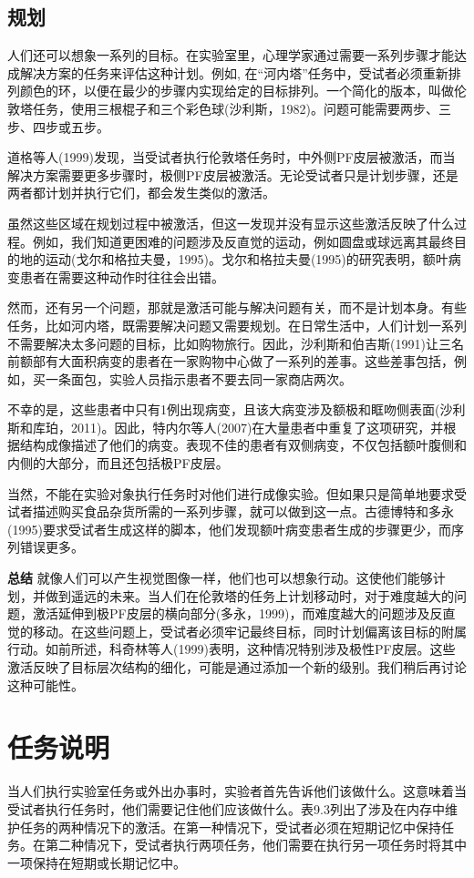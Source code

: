 \subsection{规划}
人们还可以想象一系列的目标。在实验室里，心理学家通过需要一系列步骤才能达成解决方案的任务来评估这种计划。例如, 在“河内塔”任务中，受试者必须重新排列颜色的环，以便在最少的步骤内实现给定的目标排列。一个简化的版本，叫做伦敦塔任务，使用三根棍子和三个彩色球(沙利斯，1982)。问题可能需要两步、三步、四步或五步。
\par
道格等人(1999)发现，当受试者执行伦敦塔任务时，中外侧PF皮层被激活，而当解决方案需要更多步骤时，极侧PF皮层被激活。无论受试者只是计划步骤，还是两者都计划并执行它们，都会发生类似的激活。
\par
虽然这些区域在规划过程中被激活，但这一发现并没有显示这些激活反映了什么过程。例如，我们知道更困难的问题涉及反直觉的运动，例如圆盘或球远离其最终目的地的运动(戈尔和格拉夫曼，1995)。戈尔和格拉夫曼(1995)的研究表明，额叶病变患者在需要这种动作时往往会出错。
\par
然而，还有另一个问题，那就是激活可能与解决问题有关，而不是计划本身。有些任务，比如河内塔，既需要解决问题又需要规划。在日常生活中，人们计划一系列不需要解决太多问题的目标，比如购物旅行。因此，沙利斯和伯吉斯(1991)让三名前额部有大面积病变的患者在一家购物中心做了一系列的差事。这些差事包括，例如，买一条面包，实验人员指示患者不要去同一家商店两次。
\par
不幸的是，这些患者中只有1例出现病变，且该大病变涉及额极和眶吻侧表面(沙利斯和库珀，2011)。因此，特内尔等人(2007)在大量患者中重复了这项研究，并根据结构成像描述了他们的病变。表现不佳的患者有双侧病变，不仅包括额叶腹侧和内侧的大部分，而且还包括极PF皮层。
\par
当然，不能在实验对象执行任务时对他们进行成像实验。但如果只是简单地要求受试者描述购买食品杂货所需的一系列步骤，就可以做到这一点。古德博特和多永(1995)要求受试者生成这样的脚本，他们发现额叶病变患者生成的步骤更少，而序列错误更多。
\par
\textbf{总结}
就像人们可以产生视觉图像一样，他们也可以想象行动。这使他们能够计划，并做到遥远的未来。当人们在伦敦塔的任务上计划移动时，对于难度越大的问题，激活延伸到极PF皮层的横向部分(多永，1999)，而难度越大的问题涉及反直觉的移动。在这些问题上，受试者必须牢记最终目标，同时计划偏离该目标的附属行动。如前所述，科奇林等人(1999)表明，这种情况特别涉及极性PF皮层。这些激活反映了目标层次结构的细化，可能是通过添加一个新的级别。我们稍后再讨论这种可能性。
\section{任务说明}
\par
当人们执行实验室任务或外出办事时，实验者首先告诉他们该做什么。这意味着当受试者执行任务时，他们需要记住他们应该做什么。表9.3列出了涉及在内存中维护任务的两种情况下的激活。在第一种情况下，受试者必须在短期记忆中保持任务。在第二种情况下，受试者执行两项任务，他们需要在执行另一项任务时将其中一项保持在短期或长期记忆中。
